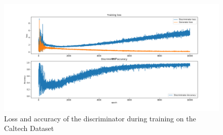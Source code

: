 \begin{figure}

\includegraphics[width=\textwidth]{fig/dcgan/caltech/loss}
  \caption{Loss and accuracy of the discriminator during training on the Caltech Dataset}
  \label{dcgan-caltech-loss}
\end{figure}



%
%

